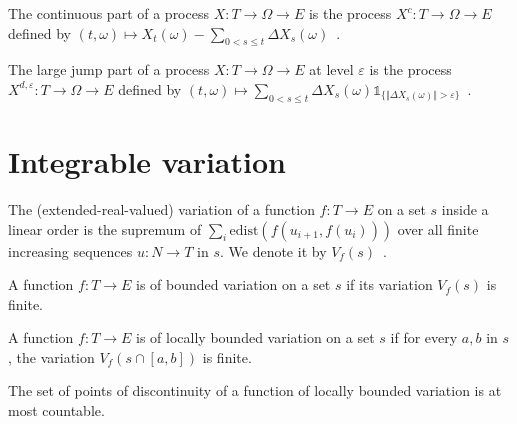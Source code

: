 \begin{definition}\label{def:continuousPart}
The continuous part of a process $X : T \to \Omega \to E$ is the process $X^c : T \to \Omega \to E$ defined by $(t, \omega) \mapsto X_t(\omega) - \sum_{0 < s \le t} \Delta X_s(\omega)$~.
\end{definition}


\begin{definition}\label{def:largeJump}
The large jump part of a process $X : T \to \Omega \to E$ at level $\varepsilon$ is the process $X^{d, \varepsilon} : T \to \Omega \to E$ defined by $(t, \omega) \mapsto \sum_{0 < s \le t} \Delta X_s(\omega) \mathbb{1}_{\{\Vert \Delta X_s(\omega) \Vert > \varepsilon\}}$~.
\end{definition}


\section{Integrable variation}

\begin{definition}\label{def:eVariationOn}
  \mathlibok
The (extended-real-valued) variation of a function $f : T \to E$ on a set $s$ inside a linear order is the supremum of $\sum_i \mathrm{edist}(f(u_{i+1}, f(u_i)))$ over all finite increasing sequences $u : N \to T$ in $s$.
We denote it by $V_f(s)$~.
\end{definition}


\begin{definition}\label{def:BoundedVariationOn}
  \mathlibok
A function $f : T \to E$ is of bounded variation on a set $s$ if its variation $V_f(s)$ is finite.
\end{definition}


\begin{definition}\label{def:LocallyBoundedVariationOn}
  \mathlibok
A function $f : T \to E$ is of locally bounded variation on a set $s$ if for every $a, b$ in $s$, the variation $V_f(s \cap [a, b])$ is finite.
\end{definition}


\begin{lemma}\label{lem:LocallyBoundedVariationOn.countable_not_continuous_at}
The set of points of discontinuity of a function of locally bounded variation is at most countable.
\end{lemma}

